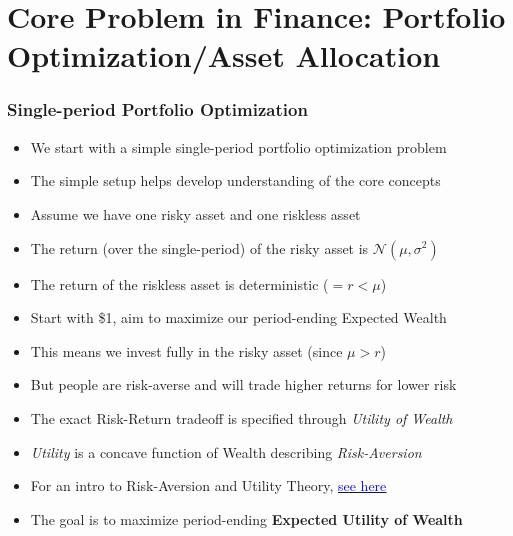 \documentclass[handout]{beamer}
\begin{document}
\section{Core Problem in Finance: Portfolio Optimization/Asset Allocation}

\begin{frame}
\frametitle{Single-period Portfolio Optimization}
\pause
\begin{itemize}[<+->]
\item We start with a simple single-period portfolio optimization problem
\item The simple setup helps develop understanding of the core concepts
\item Assume we have one risky asset and one riskless asset
\item The return (over the single-period) of the risky asset is $\mathcal{N}(\mu, \sigma^2)$
\item The return of the riskless asset is deterministic ($=r < \mu$)
\item Start with \$1, aim to maximize our period-ending Expected Wealth
\item This means we invest fully in the risky asset (since $\mu > r$)
\item But people are risk-averse and will trade higher returns for lower risk
\item The exact Risk-Return tradeoff is specified through {\em Utility of Wealth}
\item {\em Utility} is a concave function of Wealth describing {\em Risk-Aversion}
\item For an intro to Risk-Aversion and Utility Theory, \href{https://github.com/coverdrive/technical-documents/blob/master/finance/cme241/UtilityTheoryForRisk.pdf}{\underline{\textcolor{blue}{see here}}}
\item The goal is to maximize period-ending {\bf Expected Utility of Wealth}
\end{itemize}
\end{frame}
\end{document}
